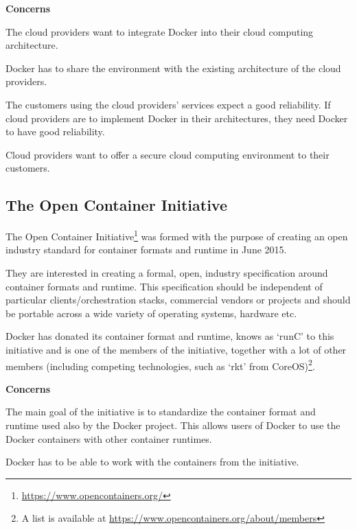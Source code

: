 \textbf{Concerns}
\begin{description}[labelindent=25pt,style=multiline,leftmargin=4.0cm,font=\normalfont\itshape]

\item[\textbf{Portability}: (Installability)] The cloud providers want to integrate Docker into their cloud computing architecture.\\ 

\item[\textbf{Compatibility}: (Co-Existence)] Docker has to share the environment with the existing architecture of the cloud providers.

\item[\textbf{Reliability}] The customers using the cloud providers' services expect a good reliability. If cloud providers are to implement Docker in their architectures, they need Docker to have good reliability.

\item[\textbf{Security}] Cloud providers want to offer a secure cloud computing environment to their customers.
\end{description}



\subsection*{The Open Container Initiative}

The Open Container Initiative\footnote{\url{https://www.opencontainers.org/}} was formed with the purpose of creating an open industry standard for container formats and runtime in June 2015.

They are interested in creating a formal, open, industry specification around container formats and runtime. This specification should be independent of particular clients/orchestration stacks, commercial vendors or projects and should be portable across a wide variety of operating systems, hardware etc.

Docker has donated its container format and runtime, knows as `runC' to this initiative and is one of the members of the initiative, together with a lot of other members (including competing technologies, such as `rkt' from CoreOS)\footnote{A list is available at \url{https://www.opencontainers.org/about/members}}.

\textbf{Concerns}
\begin{description}[labelindent=25pt,style=multiline,leftmargin=4.0cm,font=\normalfont\itshape]

\item[\textbf{Portability}] The main goal of the initiative is to standardize the container format and runtime used also by the Docker project. This allows users of Docker to use the Docker containers with other container runtimes.

\item[\textbf{Compatibility}: (Interoperability)] Docker has to be able to work with the containers from the initiative.

\end{description}

